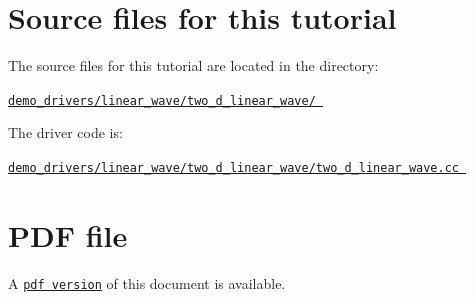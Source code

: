  

\hypertarget{index_sources}{}\section{Source files for this tutorial}\label{index_sources}

\begin{DoxyItemize}
\item The source files for this tutorial are located in the directory\+: \begin{center} \href{../../../../demo_drivers/linear_wave/two_d_linear_wave/}{\tt demo\+\_\+drivers/linear\+\_\+wave/two\+\_\+d\+\_\+linear\+\_\+wave/ } \end{center} 
\item The driver code is\+: \begin{center} \href{../../../../demo_drivers/linear_wave/two_d_linear_wave/two_d_linear_wave.cc}{\tt demo\+\_\+drivers/linear\+\_\+wave/two\+\_\+d\+\_\+linear\+\_\+wave/two\+\_\+d\+\_\+linear\+\_\+wave.\+cc } \end{center} 
\end{DoxyItemize}



 

 \hypertarget{index_pdf}{}\section{P\+D\+F file}\label{index_pdf}
A \href{../latex/refman.pdf}{\tt pdf version} of this document is available. 
